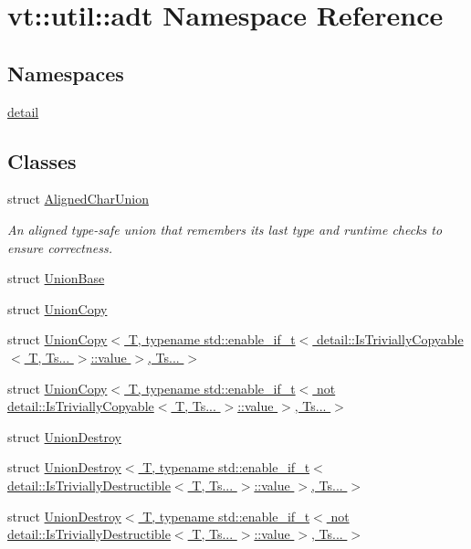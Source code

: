 \hypertarget{namespacevt_1_1util_1_1adt}{}\section{vt\+:\+:util\+:\+:adt Namespace Reference}
\label{namespacevt_1_1util_1_1adt}
\subsection*{Namespaces}
\begin{DoxyCompactItemize}
\item 
 \hyperlink{namespacevt_1_1util_1_1adt_1_1detail}{detail}
\end{DoxyCompactItemize}
\subsection*{Classes}
\begin{DoxyCompactItemize}
\item 
struct \hyperlink{structvt_1_1util_1_1adt_1_1_aligned_char_union}{Aligned\+Char\+Union}
\begin{DoxyCompactList}\small\item\em An aligned type-\/safe union that remembers its last type and runtime checks to ensure correctness. \end{DoxyCompactList}\item 
struct \hyperlink{structvt_1_1util_1_1adt_1_1_union_base}{Union\+Base}
\item 
struct \hyperlink{structvt_1_1util_1_1adt_1_1_union_copy}{Union\+Copy}
\item 
struct \hyperlink{structvt_1_1util_1_1adt_1_1_union_copy_3_01_t_00_01typename_01std_1_1enable__if__t_3_01detail_1_39951ca88dc847bbf698c46d828c8188}{Union\+Copy$<$ T, typename std\+::enable\+\_\+if\+\_\+t$<$ detail\+::\+Is\+Trivially\+Copyable$<$ T, Ts... $>$\+::value $>$, Ts... $>$}
\item 
struct \hyperlink{structvt_1_1util_1_1adt_1_1_union_copy_3_01_t_00_01typename_01std_1_1enable__if__t_3_01not_01det4a1e3b5522a7a77cb5d4fb8991a6197b}{Union\+Copy$<$ T, typename std\+::enable\+\_\+if\+\_\+t$<$ not detail\+::\+Is\+Trivially\+Copyable$<$ T, Ts... $>$\+::value $>$, Ts... $>$}
\item 
struct \hyperlink{structvt_1_1util_1_1adt_1_1_union_destroy}{Union\+Destroy}
\item 
struct \hyperlink{structvt_1_1util_1_1adt_1_1_union_destroy_3_01_t_00_01typename_01std_1_1enable__if__t_3_01detail42179a636679a7a81522739bdddb7210}{Union\+Destroy$<$ T, typename std\+::enable\+\_\+if\+\_\+t$<$ detail\+::\+Is\+Trivially\+Destructible$<$ T, Ts... $>$\+::value $>$, Ts... $>$}
\item 
struct \hyperlink{structvt_1_1util_1_1adt_1_1_union_destroy_3_01_t_00_01typename_01std_1_1enable__if__t_3_01not_0117947c5b8b44b7d9f4a4df27d8795277}{Union\+Destroy$<$ T, typename std\+::enable\+\_\+if\+\_\+t$<$ not detail\+::\+Is\+Trivially\+Destructible$<$ T, Ts... $>$\+::value $>$, Ts... $>$}
\end{DoxyCompactItemize}
